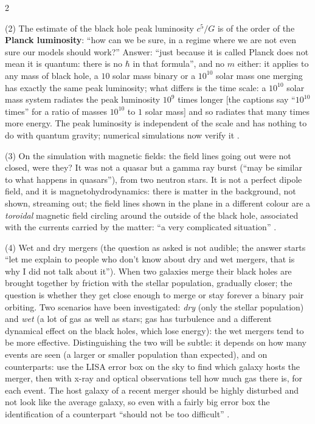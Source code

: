 \begin{paracol}{2}
\begin{coursenote}
(2) The estimate of the black hole peak luminosity $c^5/G$ is of the order of the \textbf{Planck luminosity}: ``how can we be sure, in a regime where we are not even sure our models should work?'' Answer: ``just because it is called Planck does not mean it is quantum: there is no $\hbar$ in that formula'', and no $m$ either: it applies to any mass of black hole, a $10$ solar mass binary or a $10^{10}$ solar mass one merging has exactly the same peak luminosity; what differs is the time scale: a $10^{10}$ solar mass system radiates the peak luminosity $10^9$ times longer [the captions say ``$10^{10}$ times'' for a ratio of masses $10^{10}$ to $1$ solar mass] and so radiates that many times more energy. The peak luminosity is independent of the scale and has nothing to do with quantum gravity; numerical simulations now verify it .

(3) On the simulation with magnetic fields: the field lines going out were not closed, were they? It was not a quasar but a gamma ray burst (``may be similar to what happens in quasars''), from two neutron stars. It is not a perfect dipole field, and it is magnetohydrodynamics: there is matter in the background, not shown, streaming out; the field lines shown in the plane in a different colour are a \emph{toroidal} magnetic field circling around the outside of the black hole, associated with the currents carried by the matter: ``a very complicated situation'' .

(4) Wet and dry mergers (the question as asked is not audible; the answer starts ``let me explain to people who don't know about dry and wet mergers, that is why I did not talk about it''). When two galaxies merge their black holes are brought together by friction with the stellar population, gradually closer; the question is whether they get close enough to merge or stay forever a binary pair orbiting. Two scenarios have been investigated: \emph{dry} (only the stellar population) and \emph{wet} (a lot of gas as well as stars; gas has turbulence and a different dynamical effect on the black holes, which lose energy): the wet mergers tend to be more effective. Distinguishing the two will be subtle: it depends on how many events are seen (a larger or smaller population than expected), and on counterparts: use the LISA error box on the sky to find which galaxy hosts the merger, then with x-ray and optical observations tell how much gas there is, for each event. The host galaxy of a recent merger should be highly disturbed and not look like the average galaxy, so even with a fairly big error box the identification of a counterpart ``should not be too difficult'' .
\end{coursenote}


\end{paracol}
